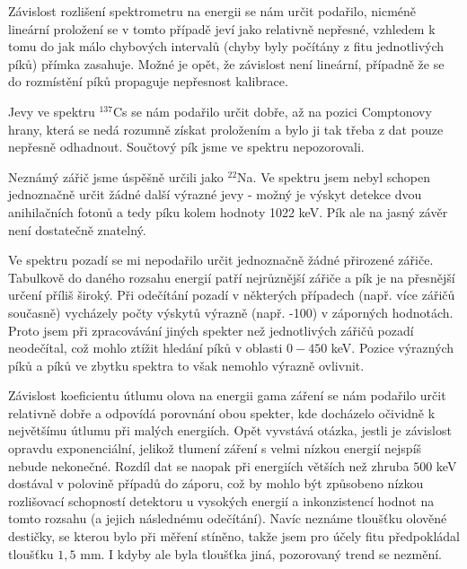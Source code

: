 \documentclass[english]{article}
\begin{document}
					Závislost rozlišení spektrometru na energii se nám určit podařilo, nicméně lineární proložení se v tomto případě jeví jako relativně nepřesné, vzhledem k tomu do jak málo chybových intervalů (chyby byly počítány z fitu jednotlivých píků) přímka zasahuje. Možné je opět, že závislost není lineární, případně že se do rozmístění píků propaguje nepřesnost kalibrace.
					
					Jevy ve spektru $^{137}$Cs se nám podařilo určit dobře, až na pozici Comptonovy hrany, která se nedá rozumně získat proložením a bylo ji tak třeba z dat pouze nepřesně odhadnout. Součtový pík jsme ve spektru nepozorovali. 
					
					Neznámý zářič jsme úspěšně určili jako $^{22}$Na. Ve spektru jsem nebyl schopen jednoznačně určit žádné další výrazné jevy - možný je výskyt detekce dvou anihilačních fotonů a tedy píku kolem hodnoty 1022 keV. Pík ale na jasný závěr není dostatečně znatelný.
					
					Ve spektru pozadí se mi nepodařilo určit jednoznačně žádné přirozené zářiče. Tabulkově \cite{bib:net} do daného rozsahu energií patří nejrůznější zářiče a pík je na přesnější určení příliš široký. Při odečítání pozadí v některých případech (např. více zářičů současně) vycházely počty výskytů výrazně (např. -100) v záporných hodnotách. Proto jsem při zpracovávání jiných spekter než jednotlivých zářičů pozadí neodečítal, což mohlo ztížit hledání píků v oblasti $0-450$ keV. Pozice výrazných píků a píků ve zbytku spektra to však nemohlo výrazně ovlivnit.  
					
					Závislost koeficientu útlumu olova na energii gama záření se nám podařilo určit relativně dobře a odpovídá porovnání obou spekter, kde docházelo očividně k největšímu útlumu při malých energiích. Opět vyvstává otázka, jestli je závislost opravdu exponenciální, jelikož tlumení záření s velmi nízkou energií nejspíš nebude nekonečné. Rozdíl dat se naopak při energiích větších než zhruba $500$ keV dostával v polovině případů do záporu, což by mohlo být způsobeno nízkou rozlišovací schopností detektoru u vysokých energií a inkonzistencí hodnot na tomto rozsahu (a jejich následnému odečítání). Navíc neznáme tloušťku olověné destičky, se kterou bylo při měření stíněno, takže jsem pro účely fitu předpokládal tloušťku $1,5$ mm. I kdyby ale byla tloušťka jiná, pozorovaný trend se nezmění.
			
\end{document}
